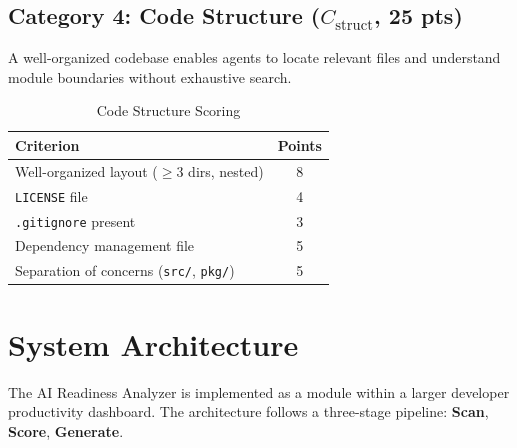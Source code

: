 \documentclass[11pt,twocolumn]{article}
\begin{document}
\subsection{Category 4: Code Structure ($C_{\text{struct}}$, 25 pts)}
\label{sec:cat4}

A well-organized codebase enables agents to locate relevant files and
understand module boundaries without exhaustive search.

\begin{table}[H]
\centering
\caption{Code Structure Scoring}
\label{tab:cat4}
\begin{tabular}{@{}lc@{}}
\toprule
\textbf{Criterion} & \textbf{Points} \\
\midrule
Well-organized layout ($\geq$3 dirs, nested) & 8 \\
\texttt{LICENSE} file & 4 \\
\texttt{.gitignore} present & 3 \\
Dependency management file & 5 \\
Separation of concerns (\texttt{src/}, \texttt{pkg/}) & 5 \\
\bottomrule
\end{tabular}
\end{table}

\section{System Architecture}
\label{sec:system}

The AI Readiness Analyzer is implemented as a module within a larger
developer productivity dashboard. The architecture follows a
three-stage pipeline: \textbf{Scan}, \textbf{Score}, \textbf{Generate}.
\end{document}
